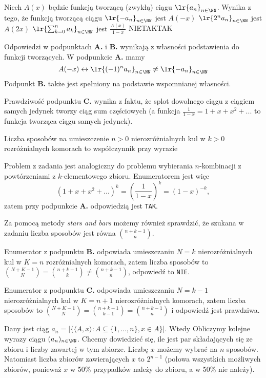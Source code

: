 \begin{solutions}
    \sol Niech $A(x)$ będzie funkcją tworzącą (zwykłą) ciągu $\lr{a_n}_{n \in \NN}$. Wynika z tego, że funkcją tworzącą ciągu
    \answerss
    {$\lr{-a_n}_{n \in \NN}$ jest $A(-x)$}
    {$\lr{2^n a_n}_{n \in \NN}$ jest $A(2x)$}
    {$\lr{\sum_{k=0}^n a_k}_{n \in \NN}$ jest $\frac{A(x)}{1-x}$}
    {NIE}{TAK}{TAK}

    Odpowiedzi w podpunktach \textbf{A.} i \textbf{B.} wynikają z własności podstawienia do funkcji tworzących. W podpunkcie \textbf{A.} mamy $$A(-x) \leftrightarrow \lr{(-1)^n a_n}_{n \in \NN} \neq \lr{-a_n}_{n \in \NN}$$ Podpunkt \textbf{B.} także jest spełniony na podstawie wspomnianej własności.
    
    Prawdziwość podpunktu \textbf{C.} wynika z faktu, że splot
    dowolnego ciągu z ciągiem samych jedynek tworzy ciąg sum częściowych (a funkcja $\frac{1}{1-x} = 1 + x + x^2 + ...$ to funkcja tworząca ciągu samych jedynek).

    \sol Liczba sposobów na umieszczenie $n > 0$ nierozróżnialnych kul w $k > 0$ rozróżnialnych komorach to współczynnik przy wyrazie

    Problem z zadania jest analogiczny do problemu wybierania $n$-kombinacji z powtórzeniami z $k$-elementowego zbioru. Enumeratorem jest więc $$(1 + x + x^2 + \dots)^k = \left(\frac{1}{1 - x}\right)^k = (1 - x)^{-k},$$zatem przy podpunkcie \textbf{A.} odpowiedzią jest \texttt{TAK}.

    Za pomocą metody \textit{stars and bars} możemy również sprawdzić, że szukana w zadaniu liczba sposobów jest równa $\binom{n + k - 1}{n}$. 
    
    Enumerator z podpunktu \textbf{B.} odpowiada umieszczaniu $N = k$ nierozróżnialnych kul w $K = n$ rozróżnialnych komorach, zatem liczba sposobów to $\binom{N + K - 1}{N} = \binom{n + k - 1}{k} \neq \binom{n + k - 1}{n}$, 
    odpowiedź to \texttt{NIE}.

    Enumerator z podpunktu \textbf{C.} odpowiada umieszczaniu $N = k - 1$ nierozróżnialnych kul w $K = n + 1$ nierozróżnialnych komorach, zatem liczba sposobów to $\binom{N + K - 1}{N} = \binom{n + k - 1}{k - 1} = \binom{n + k - 1}{n}$ i odpowiedź jest prawdziwa.

    \sol Dany jest ciąg $a_n = |\{\langle A, x \rangle: A \subseteq \{1, ..., n\}, x \in A\}|$. Wtedy
    Obliczymy kolejne wyrazy ciągu $(a_n)_{n \in \NN}$. Chcemy dowiedzieć się, ile jest par składających się ze zbioru i liczby zawartej w tym zbiorze. Liczbę $x$ możemy wybrać na $n$ sposobów. Natomiast liczba zbiorów zawierających $x$ to $2^{n-1}$ (połowa wszystkich możliwych zbiorów, ponieważ $x$ w 50\% przypadków należy do zbioru, a w 50\% nie należy).
    

\end{solutions}
